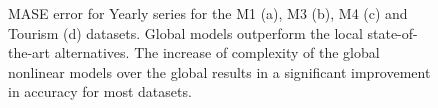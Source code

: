 \documentclass[a4paper]{article}
\theoremstyle{custom}
\begin{document}
\begin{figure}
\centering
{}
\hspace{0mm}
\caption{MASE error for Yearly series for the M1 (a), M3 (b), M4 (c) and Tourism (d) datasets. Global models outperform the local state-of-the-art alternatives. The increase of complexity of the global nonlinear models over the global results in a significant improvement in accuracy for most datasets.}
\label{fig:totalyearly}
\end{figure}
\end{document}

